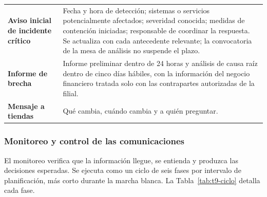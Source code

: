 \documentclass[11pt]{article}
\begin{document}
\begin{longtable}[]{@{}
  >{\raggedright\arraybackslash}p{}
  >{\raggedright\arraybackslash}p{}@{}}
\textbf{Aviso inicial de incidente crítico} & Fecha y hora de detección; sistemas o servicios potencialmente afectados; severidad conocida; medidas de contención iniciadas; responsable de coordinar la respuesta. Se actualiza con cada antecedente relevante; la convocatoria de la mesa de análisis no suspende el plazo. \\ \addlinespace
\textbf{Informe de brecha} & Informe preliminar dentro de 24 horas y análisis de causa raíz dentro de cinco días hábiles, con la información del negocio financiero tratada solo con las contrapartes autorizadas de la filial. \\ \addlinespace
\textbf{Mensaje a tiendas} & Qué cambia, cuándo cambia y a quién preguntar. \\
\end{longtable}

\subsubsection{Monitoreo y control de las comunicaciones}\label{t9-5-monitoreo}

El monitoreo verifica que la información llegue, se entienda y produzca las decisiones esperadas. Se ejecuta como un ciclo de seis fases por intervalo de planificación, más corto durante la marcha blanca. La Tabla~\mbox{\ref{tab:t9-ciclo}} detalla cada fase.
\end{document}
